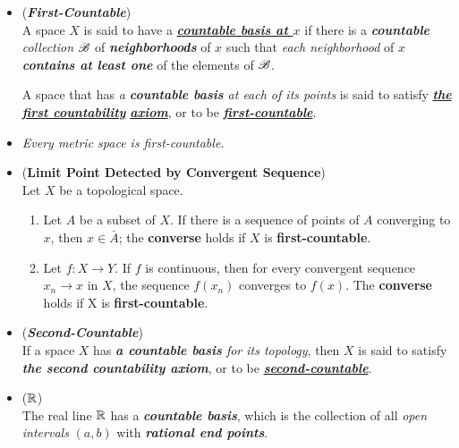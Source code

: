 \documentclass[11pt]{article}
\begin{document}
\begin{itemize}
\item  \begin{definition} (\emph{\textbf{First-Countable}})\\
A space $X$ is said to have a \underline{\emph{\textbf{countable basis at $x$}}} if there is a \emph{\textbf{countable} collection} ${\mathscr B}$ of \emph{\textbf{neighborhoods}} of $x$ such that \emph{each neighborhood} of $x$ \emph{\textbf{contains at least one}} of the elements of ${\mathscr B}$. 

A space that has \emph{a \textbf{countable basis} at each of its points} is said to satisfy \underline{\emph{\textbf{the first countability}}} \underline{\emph{\textbf{axiom}}}, or to be \underline{\emph{\textbf{first-countable}}}.
\end{definition}

\item \begin{remark}
\emph{Every metric space is first-countable.}
\end{remark}

\item \begin{proposition} (\textbf{Limit Point Detected by Convergent Sequence}) \citep{munkres2000topology}\\
Let $X$ be a topological space.
\begin{enumerate}
\item Let $A$ be a subset of $X$. If there is a sequence of points of $A$ converging to $x$, then $x \in \bar{A}$; the \textbf{converse} holds if $X$ is \textbf{first-countable}.
\item Let $f : X \rightarrow Y$. If $f$ is continuous, then for every convergent sequence $x_n \rightarrow x$ in $X$, the sequence $f(x_n)$ converges to $f(x)$. The \textbf{converse} holds if X is \textbf{first-countable}.
\end{enumerate}
\end{proposition}

\item \begin{definition} (\emph{\textbf{Second-Countable}})\\
If a space $X$ has \emph{\textbf{a countable basis} for its topology}, then $X$ is said to satisfy \emph{\textbf{the second countability axiom}}, or to be \underline{\emph{\textbf{second-countable}}}.
\end{definition}

\item \begin{example} (${\mathbb R}$)\\
The real line ${\mathbb R}$ has a \emph{\textbf{countable basis}}, which is the collection of all \emph{open intervals} $(a, b)$ with \emph{\textbf{rational end points}}.
\end{example}


\end{itemize}
\end{document}
